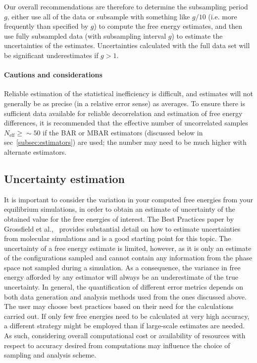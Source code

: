 \documentclass[9pt,bestpractices]{livecoms}
\begin{document}
Our overall recommendations are therefore to determine the subsampling period $g$, either use all of the data or subsample with something like $g/10$ (i.e. more frequently than specified by $g$) to compute the free energy estimates, and then use fully subsampled data (with subsampling interval $g$) to estimate the uncertainties of the estimates.  Uncertainties calculated with the full data set will be significant underestimates if $g > 1$.

\paragraph{Cautions and considerations}
Reliable estimation of the statistical inefficiency is difficult, and estimates will not generally be as precise (in a relative error sense) as averages.
To ensure there is sufficient data available for reliable decorrelation and estimation of free energy differences, it is recommended that the effective number of uncorrelated samples $N_{\mathrm{eff}} \ge  \sim 50$ if the BAR or MBAR estimators (discussed below in sec~\ref{subsec:estimators}) are used; the number may need to be much higher with alternate estimators.


\subsection{Uncertainty estimation}
\label{subsec:uncertainty}
It is important to consider the variation in your computed free energies from your equilibrium simulations, in order to obtain an estimate of uncertainty of the obtained value for the free energies of interest. The Best Practices paper by Grossfield et al.,~\cite{grossfield2018best} provides substantial detail on how to estimate uncertainties from molecular simulations and is a good starting point for this topic. 
The uncertainty of a free energy estimate is limited, however, as it is only an estimate of the configurations sampled and cannot contain any information from the phase space not sampled during a simulation. As a consequence, the variance in free energy afforded by any estimator will always be an underestimate of the true uncertainty.
In general, the quantification of different error metrics depends on both data generation and analysis methods used from the ones discussed above. The user may choose best practices based on their need for the calculations carried out. If only few free energies need to be calculated at very high accuracy, a different strategy might be employed than if large-scale estimates are needed. As such, considering overall computational cost or availability of resources with respect to accuracy desired from computations may influence the choice of sampling and analysis scheme. 
\end{document}
